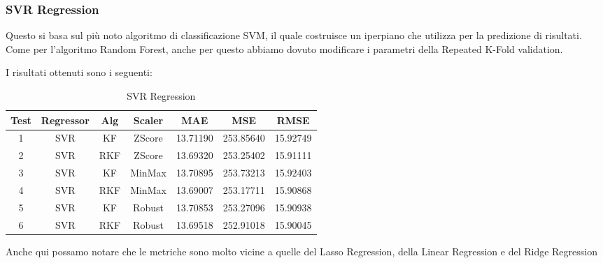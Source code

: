 \subsubsection{SVR Regression}
\fancyhead[]{}

Questo si basa sul più
noto algoritmo di classificazione SVM, il quale costruisce un iperpiano che utilizza per la
predizione di risultati. Come per l’algoritmo Random Forest, anche per questo abbiamo
dovuto modificare i parametri della Repeated K-Fold validation.

I risultati ottenuti sono i seguenti:
\begin{table}[!htbp]
    \centering
    \caption{SVR Regression}
    \begin{tabular}{|c|c|c|c|c|c|c|}
        \hline
        Test & Regressor & Alg & Scaler & MAE & MSE & RMSE \\
        \hline
        1 & SVR & KF & ZScore & 13.71190 & 253.85640 & 15.92749 \\
        \hline
        2 & SVR & RKF & ZScore & 13.69320 & 253.25402 & 15.91111 \\
        \hline
        3 & SVR & KF & MinMax & 13.70895 & 253.73213 & 15.92403 \\
        \hline
        4 & SVR & RKF & MinMax & 13.69007 & 253.17711 & 15.90868 \\
        \hline
        5 & SVR & KF & Robust & 13.70853 & 253.27096 & 15.90938 \\
        \hline
        6 & SVR & RKF & Robust & 13.69518 & 252.91018 & 15.90045 \\
        \hline
    \end{tabular}
    \label{tab:random_forest}
\end{table} 

Anche qui possamo notare che le metriche sono molto vicine a quelle del Lasso Regression, della Linear Regression e del Ridge Regression